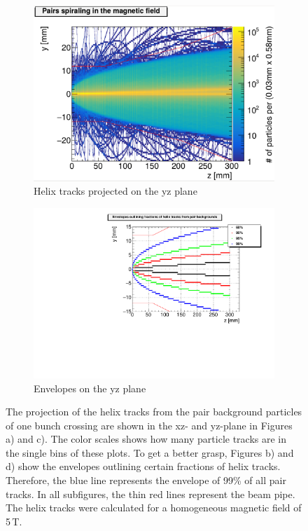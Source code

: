 \begin{figure}
\begin{subfigure}[b]{0.49\textwidth}
    \centering
        \includegraphics[height=0.26\textheight]{figures/Helix_tracks_yz_1bunch_lowres.pdf}
        \caption{Helix tracks projected on the yz plane}
	\label{fig:helix_yz}
    \end{subfigure}
    \begin{subfigure}[b]{0.49\textwidth}
    \centering
        \includegraphics[height=0.26\textheight]{figures/HelixEnvelopes_yz.pdf}
        \caption{Envelopes on the yz plane}
        \label{fig:envelopes_yz}
    \end{subfigure}
    \caption[Helix tracks and their envelopes]{
    The projection of the helix tracks from the pair background particles of one bunch crossing are shown in the xz- and yz-plane in Figures a) and c).
    The color scales shows how many particle tracks are in the single bins of these plots.
    To get a better grasp, Figures b) and d) show the envelopes outlining certain fractions of helix tracks.
    Therefore, the blue line represents the envelope of 99\% of all pair tracks.
    In all subfigures, the thin red lines represent the beam pipe.
    The helix tracks were calculated for a homogeneous magnetic field of \unit{5}\,{T}.
    }
    \label{fig:Helixes}
\end{figure}

